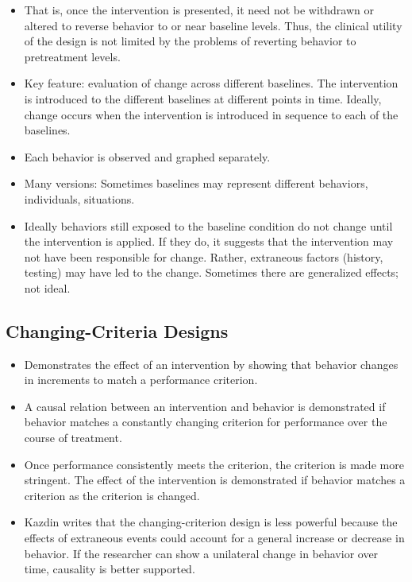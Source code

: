 \documentclass[
  english,
]{book}
\providecommand{\tightlist}{%
  \setlength{\itemsep}{0pt}\setlength{\parskip}{0pt}}
\begin{document}
\begin{itemize}
\tightlist
\item
  That is, once the intervention is presented, it need not be withdrawn or altered to reverse behavior to or near baseline levels. Thus, the clinical utility of the design is not limited by the problems of reverting behavior to pretreatment levels.
\item
  Key feature: evaluation of change across different baselines. The intervention is introduced to the different baselines at different points in time. Ideally, change occurs when the intervention is introduced in sequence to each of the baselines.
\item
  Each behavior is observed and graphed separately.
\item
  Many versions: Sometimes baselines may represent different behaviors, individuals, situations.
\item
  Ideally behaviors still exposed to the baseline condition do not change until the intervention is applied. If they do, it suggests that the intervention may not have been responsible for change. Rather, extraneous factors (history, testing) may have led to the change. Sometimes there are generalized effects; not ideal.
\end{itemize}

\hypertarget{changing-criteria-designs}{%
\subsection{Changing-Criteria Designs}\label{changing-criteria-designs}}

\begin{itemize}
\tightlist
\item
  Demonstrates the effect of an intervention by showing that behavior changes in increments to match a performance criterion.
\item
  A causal relation between an intervention and behavior is demonstrated if behavior matches a constantly changing criterion for performance over the course of treatment.
\item
  Once performance consistently meets the criterion, the criterion is made more stringent. The effect of the intervention is demonstrated if behavior matches a criterion as the criterion is changed.
\item
  Kazdin writes that the changing-criterion design is less powerful because the effects of extraneous events could account for a general increase or decrease in behavior. If the researcher can show a unilateral change in behavior over time, causality is better supported.
\end{itemize}
\end{document}
